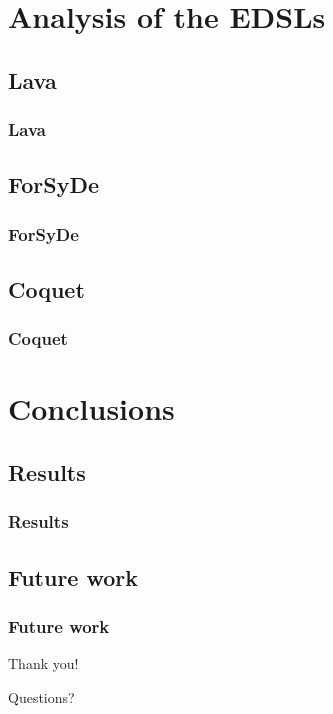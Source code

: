 \documentclass{beamer}
\begin{document}
    \section{Analysis of the EDSLs}
    \label{sec:analysis-of-the-edsls}
        \frame{\sectionpage}

        \subsection{Lava}
        \label{subsec:lava}
            \begin{frame}
                \frametitle{Lava}

            \end{frame}

        \subsection{ForSyDe}
        \label{subsec:forsyde}
            \begin{frame}
                \frametitle{ForSyDe}
            \end{frame}

        \subsection{Coquet}
        \label{subsec:coquet}
            \begin{frame}
                \frametitle{Coquet}
            \end{frame}



    \section{Conclusions}
    \label{sec:conclusions}
        \frame{\sectionpage}

        \subsection{Results}
        \label{subsec:results}
            \begin{frame}
                \frametitle{Results}
            \end{frame}


        \subsection{Future work}
        \label{subsec:future-work}
            \begin{frame}
                \frametitle{Future work}
            \end{frame}


        \begin{frame}[plain]
            \begin{center}
                \par{\Huge{Thank you!}}
                \vspace{2.0cm}
                \par{\Huge{Questions?}}
            \end{center}
        \end{frame}
\end{document}

